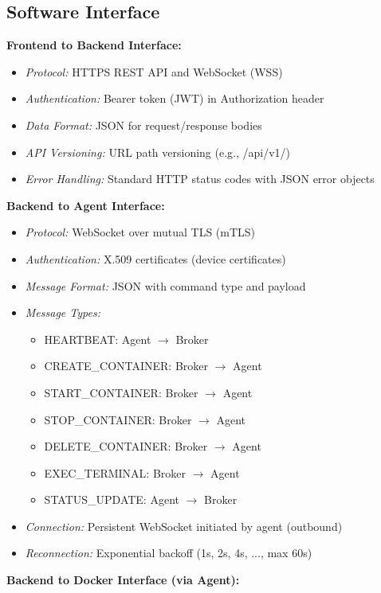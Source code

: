 \documentclass[12pt,a4paper]{article}
\begin{document}
\subsection{Software Interface}
\label{sec:softint}

\textbf{Frontend to Backend Interface:}

\begin{itemize}
    \item \textit{Protocol:} HTTPS REST API and WebSocket (WSS)
    \item \textit{Authentication:} Bearer token (JWT) in Authorization header
    \item \textit{Data Format:} JSON for request/response bodies
    \item \textit{API Versioning:} URL path versioning (e.g., /api/v1/)
    \item \textit{Error Handling:} Standard HTTP status codes with JSON error objects
\end{itemize}

\textbf{Backend to Agent Interface:}

\begin{itemize}
    \item \textit{Protocol:} WebSocket over mutual TLS (mTLS)
    \item \textit{Authentication:} X.509 certificates (device certificates)
    \item \textit{Message Format:} JSON with command type and payload
    \item \textit{Message Types:}
    \begin{itemize}
        \item HEARTBEAT: Agent $\rightarrow$ Broker
        \item CREATE\_CONTAINER: Broker $\rightarrow$ Agent
        \item START\_CONTAINER: Broker $\rightarrow$ Agent
        \item STOP\_CONTAINER: Broker $\rightarrow$ Agent
        \item DELETE\_CONTAINER: Broker $\rightarrow$ Agent
        \item EXEC\_TERMINAL: Broker $\rightarrow$ Agent
        \item STATUS\_UPDATE: Agent $\rightarrow$ Broker
    \end{itemize}
    \item \textit{Connection:} Persistent WebSocket initiated by agent (outbound)
    \item \textit{Reconnection:} Exponential backoff (1s, 2s, 4s, ..., max 60s)
\end{itemize}
\textbf{Backend to Docker Interface (via Agent):}
\end{document}
